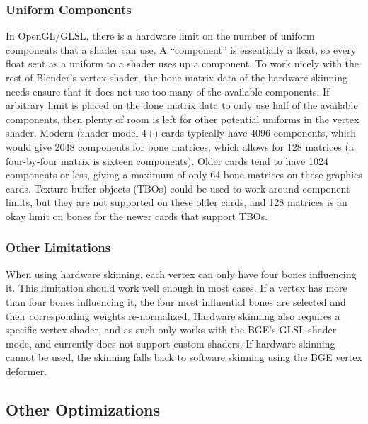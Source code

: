 
\subsubsection{Uniform Components}

In OpenGL/GLSL, there is a hardware limit on the number of uniform components that a shader can use.
A ``component'' is essentially a float, so every float sent as a uniform to a shader uses up a component.
To work nicely with the rest of Blender's vertex shader, the bone matrix data of the hardware skinning needs ensure that it does not use too many of the available components.
If arbitrary limit is placed on the done matrix data to only use half of the available components, then plenty of room is left for other potential uniforms in the vertex shader.
Modern (shader model 4+) cards typically have 4096 components, which would give 2048 components for bone matrices, which allows for 128 matrices (a four-by-four matrix is sixteen components).
Older cards tend to have 1024 components or less, giving a maximum of only 64 bone matrices on these graphics cards.
Texture buffer objects (TBOs) could be used to work around component limits\cite{ARB_texture_buffer_object}, but they are not supported on these older cards, and 128 matrices is an okay limit on bones for the newer cards that support TBOs.

\subsubsection{Other Limitations}

When using hardware skinning, each vertex can only have four bones influencing it.
This limitation should work well enough in most cases.
If a vertex has more than four bones influencing it, the four most influential bones are selected and their corresponding weights re-normalized.
Hardware skinning also requires a specific vertex shader, and as such only works with the BGE's GLSL shader mode, and currently does not support custom shaders.
If hardware skinning cannot be used, the skinning falls back to software skinning using the BGE vertex deformer.


\subsection{Other Optimizations}
